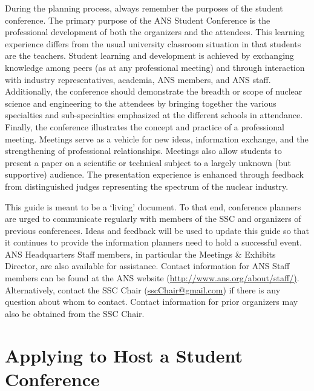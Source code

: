 \documentclass[12pt]{article}
\begin{document}
During the planning process, always remember the purposes of the student conference.
The primary purpose of the ANS Student Conference is the professional development of both the organizers and the attendees.
This learning experience differs from the usual university classroom situation in that students are the teachers.
Student learning and development is achieved by exchanging knowledge among peers (as at any professional meeting) and through interaction with industry representatives, academia, ANS members, and ANS staff.
Additionally, the conference should demonstrate the breadth or scope of nuclear science and engineering to the attendees by bringing together the various specialties and sub-specialties emphasized at the different schools in attendance.
Finally, the conference illustrates the concept and practice of a professional meeting.
Meetings serve as a vehicle for new ideas, information exchange, and the strengthening of professional relationships.
Meetings also allow students to present a paper on a scientific or technical subject to a largely unknown (but supportive) audience.
The presentation experience is enhanced through feedback from distinguished judges representing the spectrum of the nuclear industry.

This guide is meant to be a `living' document.
To that end, conference planners are urged to communicate regularly with members of the SSC and organizers of previous conferences.
Ideas and feedback will be used to update this guide so that it continues to provide the information planners need to hold a successful event.
ANS Headquarters Staff members, in particular the Meetings \& Exhibits Director, are also available for assistance.
Contact information for ANS Staff members can be found at the ANS website (\href{http://www.ans.org/about/staff/}{http://www.ans.org/about/staff/)}.
Alternatively, contact the SSC Chair \mbox{(\href{mailto:sscChair@gmail.com}{sscChair@gmail.com})} if there is any question about whom to contact.
Contact information for prior organizers may also be obtained from the SSC Chair.

\section{Applying to Host a Student Conference}
\end{document}
